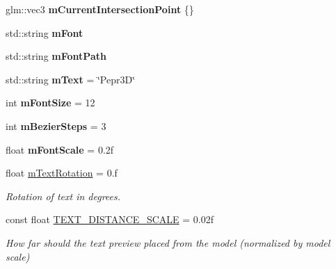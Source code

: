 \begin{DoxyCompactItemize}
glm\+::vec3 {\bfseries m\+Current\+Intersection\+Point} \{\}
\item 
\mbox{\label{classpepr3d_1_1_text_editor_a083f0600b1412d98a8a4e98588474f5a}} 
std\+::string {\bfseries m\+Font}
\item 
\mbox{\label{classpepr3d_1_1_text_editor_a2586c9a5862e1a87cf0b888c343a91ae}} 
std\+::string {\bfseries m\+Font\+Path}
\item 
\mbox{\label{classpepr3d_1_1_text_editor_aeb1c8cb4529b4420fcc55ad6ffeff6f9}} 
std\+::string {\bfseries m\+Text} = \char`\"{}Pepr3D\char`\"{}
\item 
\mbox{\label{classpepr3d_1_1_text_editor_ad6cfceb88b4988d66f1c2088c75d3bcd}} 
int {\bfseries m\+Font\+Size} = 12
\item 
\mbox{\label{classpepr3d_1_1_text_editor_a2d5c48f7ce2bf201b35a409428f6fd94}} 
int {\bfseries m\+Bezier\+Steps} = 3
\item 
\mbox{\label{classpepr3d_1_1_text_editor_aaef16fdb05549a5c778d46b563e5b491}} 
float {\bfseries m\+Font\+Scale} = 0.\+2f
\item 
\mbox{\label{classpepr3d_1_1_text_editor_ab8655ad98860f317999f61e16eaf28cf}} 
float \mbox{\hyperlink{classpepr3d_1_1_text_editor_ab8655ad98860f317999f61e16eaf28cf}{m\+Text\+Rotation}} = 0.f
\begin{DoxyCompactList}\small\item\em Rotation of text in degrees. \end{DoxyCompactList}\item 
\mbox{\label{classpepr3d_1_1_text_editor_a367eed1983f4cd98bc465206ac2bf6ee}} 
const float \mbox{\hyperlink{classpepr3d_1_1_text_editor_a367eed1983f4cd98bc465206ac2bf6ee}{T\+E\+X\+T\+\_\+\+D\+I\+S\+T\+A\+N\+C\+E\+\_\+\+S\+C\+A\+LE}} = 0.\+02f
\begin{DoxyCompactList}\small\item\em How far should the text preview placed from the model (normalized by model scale) \end{DoxyCompactList}\item 

\end{DoxyCompactItemize}
